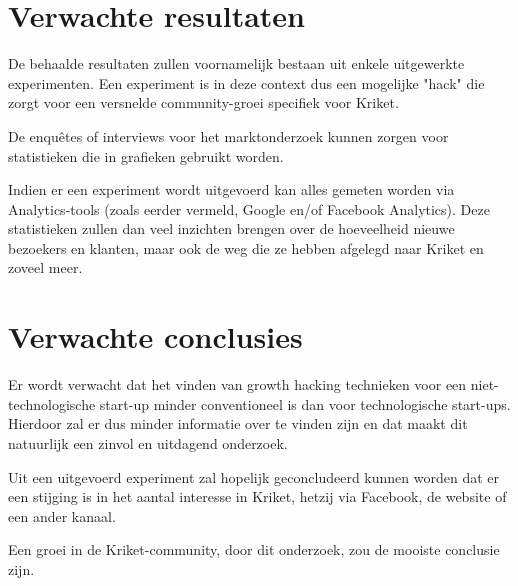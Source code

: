 \section{Verwachte resultaten}
\label{sec:verwachte_resultaten}

De behaalde resultaten zullen voornamelijk bestaan uit enkele uitgewerkte experimenten. Een experiment is in deze context dus een mogelijke "hack" die zorgt voor een versnelde community-groei specifiek voor Kriket. 

De enquêtes of interviews voor het marktonderzoek kunnen zorgen voor statistieken die in grafieken gebruikt worden.

Indien er een experiment wordt uitgevoerd kan alles gemeten worden via Analytics-tools (zoals eerder vermeld, Google en/of Facebook Analytics). Deze statistieken zullen dan veel inzichten brengen over de hoeveelheid nieuwe bezoekers en klanten, maar ook de weg die ze hebben afgelegd naar Kriket en zoveel meer.


\section{Verwachte conclusies}
\label{sec:verwachte_conclusies}

Er wordt verwacht dat het vinden van growth hacking technieken voor een niet-technologische start-up minder conventioneel is dan voor technologische start-ups. Hierdoor zal er dus minder informatie over te vinden zijn en dat maakt dit natuurlijk een zinvol en uitdagend onderzoek.

Uit een uitgevoerd experiment zal hopelijk geconcludeerd kunnen worden dat er een stijging is in het aantal interesse in Kriket, hetzij via Facebook, de website of een ander kanaal.

Een groei in de Kriket-community, door dit onderzoek, zou de mooiste conclusie zijn.

